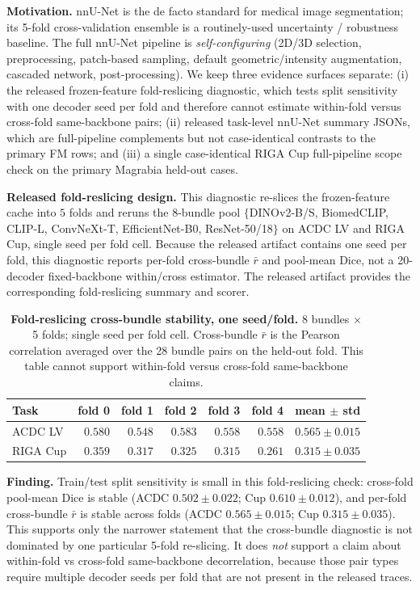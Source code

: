 \textbf{Motivation.} nnU-Net \citep{isensee2021nnunet} is the de facto standard for medical image segmentation; its 5-fold cross-validation ensemble is a routinely-used uncertainty / robustness baseline. The full nnU-Net pipeline is \emph{self-configuring} (2D/3D selection, preprocessing, patch-based sampling, default geometric/intensity augmentation, cascaded network, post-processing). We keep three evidence surfaces separate: (i) the released frozen-feature fold-reslicing diagnostic, which tests split sensitivity with one decoder seed per fold and therefore cannot estimate within-fold versus cross-fold same-backbone pairs; (ii) released task-level nnU-Net summary JSONs, which are full-pipeline complements but not case-identical contrasts to the primary FM rows; and (iii) a single case-identical RIGA Cup full-pipeline scope check on the primary Magrabia held-out cases.

\textbf{Released fold-reslicing design.} This diagnostic re-slices the frozen-feature cache into $5$ folds and reruns the 8-bundle pool $\{$DINOv2-B/S, BiomedCLIP, CLIP-L, ConvNeXt-T, EfficientNet-B0, ResNet-50/18$\}$ on ACDC LV and RIGA Cup, single seed per fold cell. Because the released artifact contains one seed per fold, this diagnostic reports per-fold cross-bundle $\bar r$ and pool-mean Dice, not a 20-decoder fixed-backbone within/cross estimator. The released artifact provides the corresponding fold-reslicing summary and scorer.

\begin{table}[!htbp]
  \caption{\textbf{Fold-reslicing cross-bundle stability, one seed/fold.} 8 bundles $\times$ 5 folds; single seed per fold cell. Cross-bundle $\bar r$ is the Pearson correlation averaged over the 28 bundle pairs on the held-out fold. This table cannot support within-fold versus cross-fold same-backbone claims.}
  \label{tab:m15-fold}
  \centering\small
  \begin{tabular}{lrrrrrr}
    \toprule
    Task & fold 0 & fold 1 & fold 2 & fold 3 & fold 4 & mean$\,\pm\,$std \\
    \midrule
    ACDC LV  & $0.580$ & $0.548$ & $0.583$ & $0.558$ & $0.558$ & $0.565 \pm 0.015$ \\
    RIGA Cup & $0.359$ & $0.317$ & $0.325$ & $0.315$ & $0.261$ & $0.315 \pm 0.035$ \\
    \bottomrule
  \end{tabular}
\end{table}

\textbf{Finding.} Train/test split sensitivity is small in this fold-reslicing check: cross-fold pool-mean Dice is stable (ACDC $0.502 \pm 0.022$; Cup $0.610 \pm 0.012$), and per-fold cross-bundle $\bar r$ is stable across folds (ACDC $0.565 \pm 0.015$; Cup $0.315 \pm 0.035$). This supports only the narrower statement that the cross-bundle diagnostic is not dominated by one particular 5-fold re-slicing. It does \emph{not} support a claim about within-fold vs cross-fold same-backbone decorrelation, because those pair types require multiple decoder seeds per fold that are not present in the released traces.

